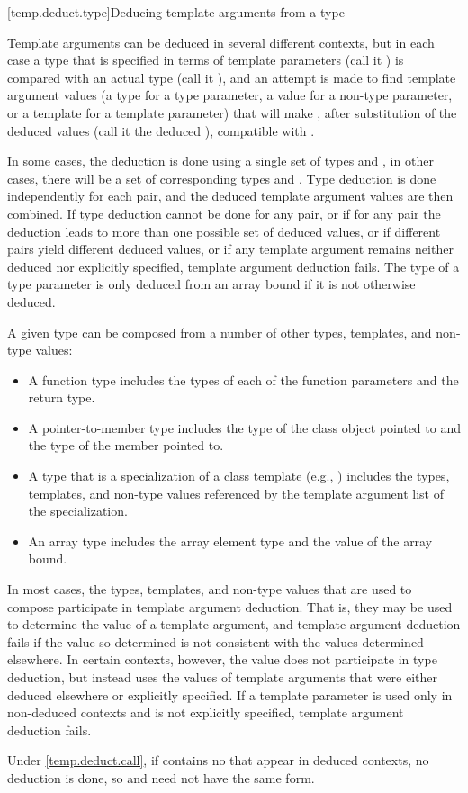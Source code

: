[temp.deduct.type]{Deducing template arguments from a type}

\pnum
Template arguments can be deduced in several different contexts, but
in each case a type that is specified in terms of template parameters
(call it
)
is compared with an actual type (call it
),
and an attempt is made to find template argument values (a type for a type
parameter, a value for a non-type parameter, or a template for a
template parameter) that will make
,
after substitution of the deduced values (call it the deduced
),
compatible with
.

\pnum
In some cases, the deduction is done using a single set of types
and
,
in other cases, there will be a set of corresponding types
and
.
Type deduction is done
independently for each
pair, and the deduced template
argument values are then combined.
If type deduction cannot be done
for any
pair, or if for any pair the deduction leads to more than
one possible set of deduced values, or if different pairs yield
different deduced values, or if any template argument remains neither
deduced nor explicitly specified, template argument deduction fails.
The type of a type parameter
is only deduced from an array bound
if it is not otherwise deduced.

\pnum
A given type
can be composed from a number of other
types, templates, and non-type values:
\begin{itemize}
\item
A function type includes the types of each of the function parameters
and the return type.
\item
A pointer-to-member type includes the type of the class object pointed to
and the type of the member pointed to.
\item
A type that is a specialization of a class template (e.g.,
)
includes the types, templates, and non-type values referenced by the
template argument list of the specialization.
\item
An array type includes the array element type and the value of the
array bound.
\end{itemize}

\pnum
In most cases, the types, templates, and non-type values that are used
to compose
participate in template argument deduction.
That is,
they may be used to determine the value of a template argument, and
template argument deduction fails if
the value so determined is not consistent with the values determined
elsewhere.
In certain contexts, however, the value does not
participate in type deduction, but instead uses the values of template
arguments that were either deduced elsewhere or explicitly specified.
If a template parameter is used only in non-deduced contexts and is not
explicitly specified, template argument deduction fails.
\begin{note}
Under \ref{temp.deduct.call},
if  contains no  that appear
in deduced contexts, no deduction is done, so  and 
need not have the same form.
\end{note}

